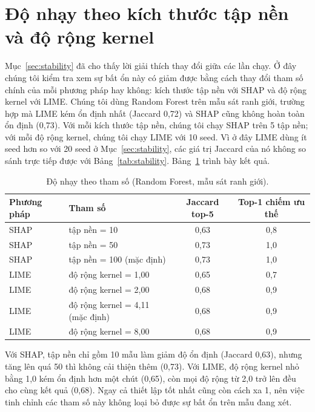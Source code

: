 \documentclass[11pt,a4paper]{article}
\begin{document}
\section{Độ nhạy theo kích thước tập nền và độ rộng kernel}\label{app:sensitivity}
Mục~\ref{sec:stability} đã cho thấy lời giải thích thay đổi giữa các lần
chạy. Ở đây chúng tôi kiểm tra xem sự bất ổn này có giảm được bằng cách thay
đổi tham số chính của mỗi phương pháp hay không: kích thước tập nền với SHAP
và độ rộng kernel với LIME. Chúng tôi dùng Random Forest trên mẫu sát ranh
giới, trường hợp mà LIME kém ổn định nhất (Jaccard 0,72) và SHAP cũng không
hoàn toàn ổn định (0,73). Với mỗi kích thước tập nền, chúng tôi chạy SHAP
trên 5 tập nền; với mỗi độ rộng kernel, chúng tôi chạy LIME với 10 seed. Vì ở
đây LIME dùng ít seed hơn so với 20 seed ở Mục~\ref{sec:stability}, các giá
trị Jaccard của nó không so sánh trực tiếp được với
Bảng~\ref{tab:stability}. Bảng~\ref{tab:sensitivity} trình bày kết quả.

\begin{table}[!htb]
\centering\small
\caption{Độ nhạy theo tham số (Random Forest, mẫu sát ranh giới).}\label{tab:sensitivity}
\begin{tabular}{llcc}
\toprule
\textbf{Phương pháp} & \textbf{Tham số} & \textbf{Jaccard top-5} & \textbf{Top-1 chiếm ưu thế}\\
\midrule
SHAP & tập nền = 10 & 0,63 & 0,8\\
SHAP & tập nền = 50 & 0,73 & 1,0\\
SHAP & tập nền = 100 (mặc định) & 0,73 & 1,0\\
LIME & độ rộng kernel = 1,00 & 0,65 & 0,7\\
LIME & độ rộng kernel = 2,00 & 0,68 & 0,9\\
LIME & độ rộng kernel = 4,11 (mặc định) & 0,68 & 0,9\\
LIME & độ rộng kernel = 8,00 & 0,68 & 0,9\\
\bottomrule
\end{tabular}
\end{table}

Với SHAP, tập nền chỉ gồm 10 mẫu làm giảm độ ổn định (Jaccard 0,63), nhưng
tăng lên quá 50 thì không cải thiện thêm (0,73). Với LIME, độ rộng kernel nhỏ
bằng 1,0 kém ổn định hơn một chút (0,65), còn mọi độ rộng từ 2,0 trở lên đều
cho cùng kết quả (0,68). Ngay cả thiết lập tốt nhất cũng còn cách xa 1, nên
việc tinh chỉnh các tham số này không loại bỏ được sự bất ổn trên mẫu đang
xét.
\end{document}
